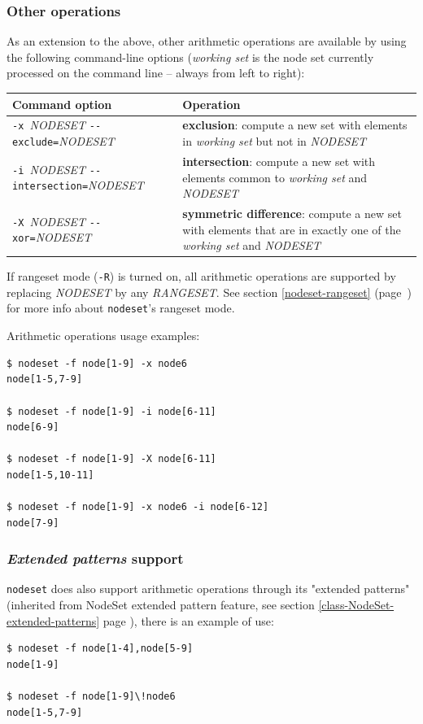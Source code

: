 \documentclass[english,a4paper]{csuserguide}
\newcommand{\nodeset}{\texttt{nodeset}\xspace}
\begin{document}
\subsubsection{Other operations}
As an extension to the above, other arithmetic operations are available by using the following command-line options (\textit{working set} is the node set currently processed on the command line -- always from left to right):
\begin{center}
\label{nodeset-ops}
\begin{tabular}{|p{5.4cm}|p{11cm}|} 
\hline 
\textbf{Command option} & \textbf{Operation} \\
\hline
\verb+-x +\textit{NODESET} \verb+--exclude=+\textit{NODESET}& \textbf{exclusion}: compute a new set with elements in \textit{working set} but not in \textit{NODESET}\\
\hline
\verb+-i +\textit{NODESET} \verb+--intersection=+\textit{NODESET}& \textbf{intersection}: compute a new set with elements common to \textit{working set} and \textit{NODESET}\\
\hline
\verb+-X +\textit{NODESET} \verb+--xor=+\textit{NODESET}& \textbf{symmetric difference}: compute a new set with elements that are in exactly one of the \textit{working set} and \textit{NODESET}\\
\hline
\end{tabular}
\end{center}

If rangeset mode (\verb+-R+) is turned on, all arithmetic operations are supported by replacing \textit{NODESET} by any \textit{RANGESET}. See section \ref{nodeset-rangeset} (page~\pageref{nodeset-rangeset}) for more info about \nodeset's rangeset mode.


Arithmetic operations usage examples:
\medskip
\begin{lstlisting}[breaklines=true, breakatwhitespace=true]
$ nodeset -f node[1-9] -x node6
node[1-5,7-9]

$ nodeset -f node[1-9] -i node[6-11]
node[6-9]

$ nodeset -f node[1-9] -X node[6-11]
node[1-5,10-11]

$ nodeset -f node[1-9] -x node6 -i node[6-12]
node[7-9]
\end{lstlisting}


\subsubsection{\textit{Extended patterns} support}
\label{nodeset-extended-patterns}
\nodeset does also support arithmetic operations through its "extended patterns" (inherited from NodeSet extended pattern feature, see section \ref{class-NodeSet-extended-patterns} page \pageref{class-NodeSet-extended-patterns}),  there is an example of use:
\medskip
\begin{lstlisting}[breaklines=true, breakatwhitespace=true]
$ nodeset -f node[1-4],node[5-9]
node[1-9]

$ nodeset -f node[1-9]\!node6   
node[1-5,7-9]
\end{lstlisting}
\end{document}
